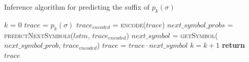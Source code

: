 \begin{algorithm}
	\caption{Inference algorithm for predicting the suffix of $p_k(\sigma)$}
	\label{alg:baseline}
	\begin{algorithmic}[1]
		\State $k$ = 0
		\State $trace$ = $p_k(\sigma)$
		\Do
		\State $trace_{encoded}$ = \textsc{encode}($trace$) \label{lst1:encoding}
		\State $next\_symbol\_probs$ = \textsc{predictNextSymbols}($lstm$, $trace_{encoded}$) \label{lst1:prob}
		\State $next\_symbol$ = \textsc{getSymbol}($next\_symbol\_prob$, $trace_{encoded}$) \label{lst1:next}
		\State $trace$ = $trace \cdot next\_symbol$\label{lst1:trace}
		\State $k = k + 1$
		\label{lst1:while}
		\State \textbf{return} $trace$
		\EndFunction
	\end{algorithmic}
\end{algorithm}



		
		
